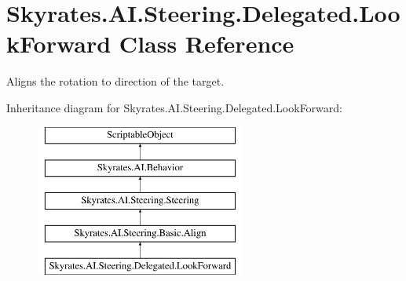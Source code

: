 \hypertarget{class_skyrates_1_1_a_i_1_1_steering_1_1_delegated_1_1_look_forward}{\section{Skyrates.\-A\-I.\-Steering.\-Delegated.\-Look\-Forward Class Reference}
\label{class_skyrates_1_1_a_i_1_1_steering_1_1_delegated_1_1_look_forward}
}


Aligns the rotation to direction of the target.  


Inheritance diagram for Skyrates.\-A\-I.\-Steering.\-Delegated.\-Look\-Forward\-:\begin{figure}[H]
\begin{center}
\leavevmode
\includegraphics[height=5.000000cm]{class_skyrates_1_1_a_i_1_1_steering_1_1_delegated_1_1_look_forward}
\end{center}
\end{figure}
